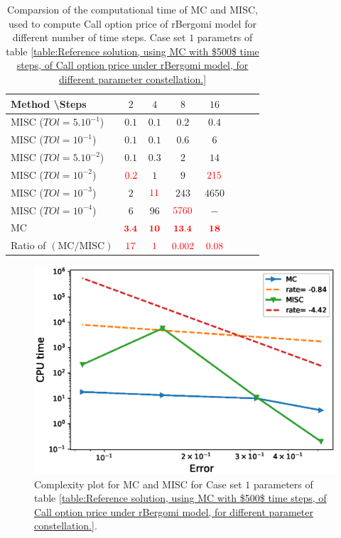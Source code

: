 \documentclass[11pt]{article}
\begin{document}
\begin{table}[h!]
	\centering
	\begin{tabular}{l*{6}{c}r}
		Method \textbackslash  Steps            & $2$ & $4$ & $8$ & $16$ &   \\
		\hline
		MISC ($TOl=5.10^{-1}$)  & $0.1$ & $0.1$ & $0.2$ & $0.4$  \\
		MISC ($TOl=10^{-1}$)  & $0.1$ & $0.1$ & $0.6$ & $6$  \\
		MISC ($TOl=5.10^{-2}$)  & $0.1$ & $0.3$ & $2$ & $14$  \\
		MISC ($TOl=10^{-2}$)  & ${\color{red}0.2}$ & $1$ & $9$ & ${\color{red}215}$  \\
		MISC ($TOl=10^{-3}$)  & $2$ & ${\color{red}11}$ & $243$ & $4650$  \\
		MISC ($TOl=10^{-4}$)  & $6$ & $96$ & ${\color{red}5760}$ & $-$  \\
		\hline
			MC     & $\mathbf{{\color{red} 3.4}}$  & $\mathbf{{\color{red}10}}$  & $\mathbf{{\color{red}13.4}}$ & $\mathbf{{\color{red}18}}$  \\
	\hline
			Ratio of $\left(\text{MC}/ \text{MISC} \right)$  &${\color{red}17}$ & ${\color{red}    1
		}$  & ${\color{red} 0.002
		}$  & ${\color{red}  0.08}$ \\
		\hline
	\end{tabular}
	\caption{Comparsion of the computational time of  MC and MISC, used to compute Call option price of rBergomi model for different number of time steps. Case set $1$ parametrs of table \ref{table:Reference solution, using MC with $500$ time steps, of Call option price under rBergomi model, for different parameter constellation.} }
	\label{Comparison of the computational time of  MC and MISC, used to compute Call option price of rBergomi model for different number of time steps. Case set1}
\end{table}

	\begin{figure}[h!]
	\centering
	\includegraphics[width=0.7\linewidth]{./figures/rBergomi_Complexity_rates/set1/error_vs_time_set1}
	
	\caption{Complexity plot for   MC and MISC for Case set $1$ parameters of table \ref{table:Reference solution, using MC with $500$ time steps, of Call option price under rBergomi model, for different parameter constellation.}.}
	\label{fig:Complexity plot for MC and MISC for Case set $1$ parameters}
\end{figure}
\end{document}
